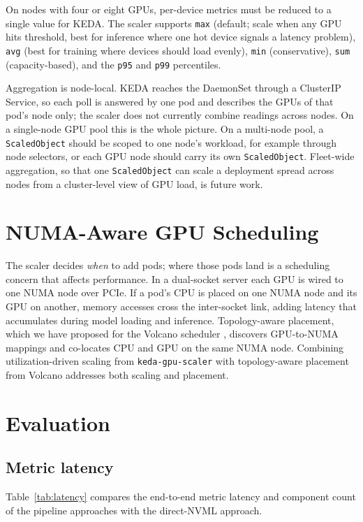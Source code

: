 \documentclass[11pt]{article}
\begin{document}
On nodes with four or eight GPUs, per-device metrics must be reduced to a single
value for KEDA. The scaler supports \texttt{max} (default; scale when any GPU
hits threshold, best for inference where one hot device signals a latency
problem), \texttt{avg} (best for training where devices should load evenly),
\texttt{min} (conservative), \texttt{sum} (capacity-based), and the \texttt{p95}
and \texttt{p99} percentiles.

Aggregation is node-local. KEDA reaches the DaemonSet through a ClusterIP Service,
so each poll is answered by one pod and describes the GPUs of that pod's node only;
the scaler does not currently combine readings across nodes. On a single-node GPU
pool this is the whole picture. On a multi-node pool, a \texttt{ScaledObject} should
be scoped to one node's workload, for example through node selectors, or each GPU
node should carry its own \texttt{ScaledObject}. Fleet-wide aggregation, so that one
\texttt{ScaledObject} can scale a deployment spread across nodes from a cluster-level
view of GPU load, is future work.

\section{NUMA-Aware GPU Scheduling}

The scaler decides \emph{when} to add pods; where those pods land is a scheduling
concern that affects performance. In a dual-socket server each GPU is wired to one
NUMA node over PCIe. If a pod's CPU is placed on one NUMA node and its GPU on
another, memory accesses cross the inter-socket link, adding latency that
accumulates during model loading and inference. Topology-aware placement, which
we have proposed for the Volcano scheduler \cite{volcano,volcanopr}, discovers
GPU-to-NUMA mappings and co-locates CPU and GPU on the same NUMA node. Combining
utilization-driven scaling from \texttt{keda-gpu-scaler} with topology-aware
placement from Volcano addresses both scaling and placement.

\section{Evaluation}

\subsection{Metric latency}
Table~\ref{tab:latency} compares the end-to-end metric latency and component count
of the pipeline approaches with the direct-NVML approach.
\end{document}
